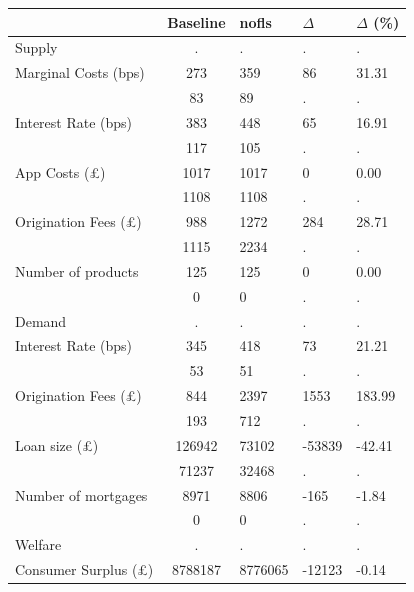 \begin{tabular}{l*{1}{c}} \hline\hline
            &    Baseline&       nofls&    $\Delta$&$\Delta$ (\%)\\
\hline
Supply      &           .&           .&           .&           .\\
\quad Marginal Costs (bps)&         273&         359&          86&       31.31\\
\quad       &          83&          89&           .&           .\\
\quad Interest Rate (bps)&         383&         448&          65&       16.91\\
\quad       &         117&         105&           .&           .\\
\quad App Costs (\pounds)&        1017&        1017&           0&        0.00\\
\quad       &        1108&        1108&           .&           .\\
\quad Origination Fees (\pounds)&         988&        1272&         284&       28.71\\
\quad       &        1115&        2234&           .&           .\\
\quad Number of products&         125&         125&           0&        0.00\\
\quad       &           0&           0&           .&           .\\
Demand      &           .&           .&           .&           .\\
\quad Interest Rate (bps)&         345&         418&          73&       21.21\\
\quad       &          53&          51&           .&           .\\
\quad Origination Fees (\pounds)&         844&        2397&        1553&      183.99\\
\quad       &         193&         712&           .&           .\\
\quad Loan size (\pounds)&      126942&       73102&      -53839&      -42.41\\
\quad       &       71237&       32468&           .&           .\\
\quad Number of mortgages&        8971&        8806&        -165&       -1.84\\
\quad       &           0&           0&           .&           .\\
Welfare     &           .&           .&           .&           .\\
\quad Consumer Surplus (\pounds)&     8788187&     8776065&      -12123&       -0.14\\

\end{tabular}
